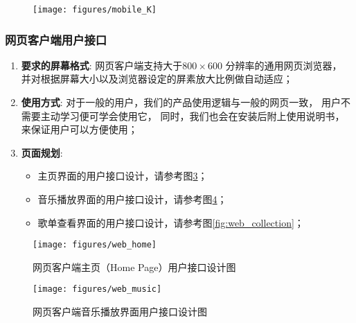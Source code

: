 \begin{enumerate}
\begin{figure}[h!]
  \caption{  \label{fig:mobile_user2}
    }
\end{figure}
\begin{figure}[h!]
  \centering

  \texttt{[image: figures/mobile\_K]}

  \caption{  \label{fig:mobile_K}
    }
\end{figure}

\subsubsection{网页客户端用户接口} %

\begin{enumerate}
	\item \textbf{要求的屏幕格式}:
		网页客户端支持大于$800 \times 600$ 分辨率的通用网页浏览器，
		并对根据屏幕大小以及浏览器设定的屏素放大比例做自动适应；
	\item \textbf{使用方式}:
		对于一般的用户，我们的产品使用逻辑与一般的网页一致，
			用户不需要主动学习便可学会使用它，
		同时，我们也会在安装后附上使用说明书，来保证用户可以方便使用；
	\item \textbf{页面规划}:  
	\begin{itemize}
		\item 主页界面的用户接口设计，请参考图\ref{fig:web_home}；
		\item 音乐播放界面的用户接口设计，请参考图\ref{fig:web_music}；
		\item 歌单查看界面的用户接口设计，请参考图\ref{fig:web_collection}；
	\end{itemize}
\end{enumerate}

\begin{figure}[h!]
  \centering

  \texttt{[image: figures/web\_home]}

  \caption{  \label{fig:web_home}
  		网页客户端主页（Home Page）用户接口设计图
    }
\end{figure}

\begin{figure}[h!]
  \centering
 
  \texttt{[image: figures/web\_music]}

  \caption{ \label{fig:web_music}
  		网页客户端音乐播放界面用户接口设计图
    }
\end{figure}


\end{enumerate}
